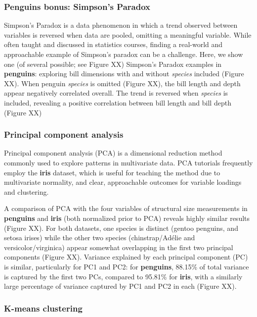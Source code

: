 \hypertarget{penguins-bonus-simpsons-paradox}{%
\subsubsection{Penguins bonus: Simpson's
Paradox}\label{penguins-bonus-simpsons-paradox}}

Simpson's Paradox is a data phenomenon in which a trend observed between
variables is reversed when data are pooled, omitting a meaningful
variable. While often taught and discussed in statistics courses,
finding a real-world and approachable example of Simpson's paradox can
be a challenge. Here, we show one (of several possible; see Figure XX)
Simpson's Paradox examples in \textbf{penguins}: exploring bill
dimensions with and without \emph{species} included (Figure XX). When
penguin \emph{species} is omitted (Figure XX), the bill length and depth
appear negatively correlated overall. The trend is reversed when
\emph{species} is included, revealing a positive correlation between
bill length and bill depth (Figure XX)

\hypertarget{principal-component-analysis}{%
\subsubsection{Principal component
analysis}\label{principal-component-analysis}}

Principal component analysis (PCA) is a dimensional reduction method
commonly used to explore patterns in multivariate data. PCA tutorials
frequently employ the \textbf{iris} dataset, which is useful for
teaching the method due to multivariate normality, and clear,
approachable outcomes for variable loadings and clustering.

A comparison of PCA with the four variables of structural size
measurements in \textbf{penguins} and \textbf{iris} (both normalized
prior to PCA) reveals highly similar results (Figure XX). For both
datasets, one species is distinct (gentoo penguins, and setosa irises)
while the other two species (chinstrap/Adélie and versicolor/virginica)
appear somewhat overlapping in the first two principal components
(Figure XX). Variance explained by each principal component (PC) is
similar, particularly for PC1 and PC2: for \textbf{penguins}, 88.15\% of
total variance is captured by the first two PCs, compared to 95.81\% for
\textbf{iris}, with a similarly large percentage of variance captured by
PC1 and PC2 in each (Figure XX).

\hypertarget{k-means-clustering}{%
\subsubsection{K-means clustering}\label{k-means-clustering}}

